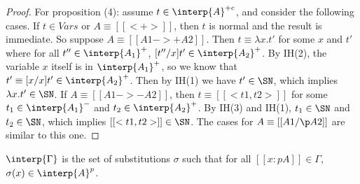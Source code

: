 \begin{proof}
  For proposition (4): assume $t\in\interp{A}^{+c}$, and consider the
  following cases.  If $t\in\textit{Vars}$ or $A\equiv[[< + >]]$, then
  $t$ is normal and the result is immediate.  So suppose $A \equiv
  [[A1 ->+ A2]]$.  Then $t\equiv \lambda x.t'$ for some $x$ and $t'$
  where for all $t''\in\interp{A_1}^+$, $[t''/x]t'\in\interp{A_2}^+$.
  By IH(2), the variable $x$ itself is in $\interp{A_1}^+$, so
  we know that $t'\equiv[x/x]t'\in\interp{A_2}^+$.  Then by IH(1)
  we have $t'\in\SN$, which implies $\lambda x.t'\in\SN$.  If $A\equiv [[A1 ->- A2]]$,
  then $t\equiv [[< t1 , t2>]]$ for some $t_1\in\interp{A_1}^-$ and
  $t_2\in\interp{A_2}^+$.  By IH(3) and IH(1), $t_1\in\SN$ and $t_2\in\SN$,
  which implies $[[< t1 , t2 >]]\in\SN$.  The cases for $A \equiv [[A1 /\p A2]]$
  are similar to this one.
\end{proof}  

\begin{definition}
$\interp{\Gamma}$ is the set of substitutions $\sigma$ such that
for all $[[ x : p A]]\in\Gamma$, $\sigma(x)\in\interp{A}^p$.
\end{definition}

